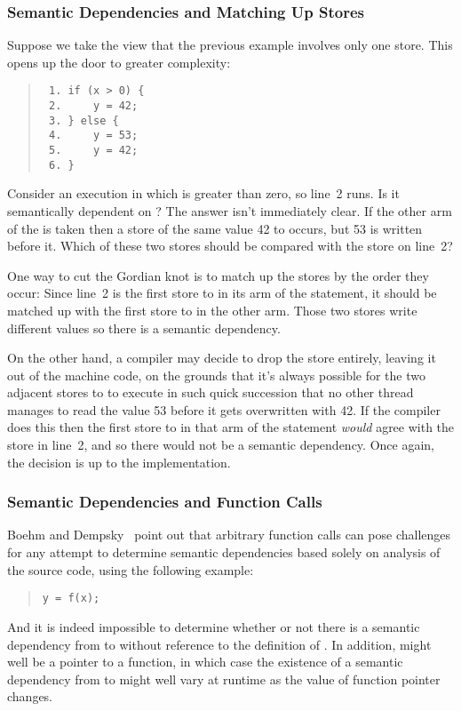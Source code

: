 \subsubsection{Semantic Dependencies and Matching Up Stores}
\label{sec:Semantic Dependencies and Matching Up Stores}

Suppose we take the view that the previous example involves only one
store.
This opens up the door to greater complexity:
\begin{quote}
\begin{verbatim}
 1. if (x > 0) {
 2.     y = 42;
 3. } else {
 4.     y = 53;
 5.     y = 42;
 6. }
\end{verbatim}
\end{quote}
Consider an execution in which  is greater than zero, so line~2
runs.
Is it semantically dependent on ?
The answer isn't immediately clear.
If the other arm of the  is taken then a store of the same value 42 to
 occurs, but 53 is written before it.
Which of these two stores should be compared with the store on line~2?

One way to cut the Gordian knot is to match up the stores by the order
they occur:
Since line~2 is the first store to  in its arm of the 
statement, it should be matched up with the first store to  in
the other arm.
Those two stores write different values so there is a semantic
dependency.

On the other hand, a compiler may decide to drop the  store entirely, leaving it out of the machine code,
on the grounds that it's always possible for the two adjacent stores
to  to execute in such quick succession that no other thread
manages to read the value 53 before it gets overwritten with 42.
If the compiler does this then the first store to  in that
arm of the  statement \emph{would} agree with the store in
line~2, and so there would not be a semantic dependency.
Once again, the decision is up to the implementation.

\subsubsection{Semantic Dependencies and Function Calls}
\label{sec:Semantic Dependencies and Function Calls}

Boehm and Dempsky~\cite[Section 5]{Boehm:2014:OGA:2618128.2618134}
point out that arbitrary function calls can pose challenges for any
attempt to determine semantic dependencies based solely on analysis
of the source code, using the following example:
\begin{quote}
\begin{verbatim}
y = f(x);
\end{verbatim}
\end{quote}
And it is indeed impossible to determine whether or not there is a
semantic dependency from  to  without reference to the
definition of .
In addition,  might well be a pointer to a function, in which case
the existence of a semantic dependency from  to  might well
vary at runtime as the value of function pointer  changes.


